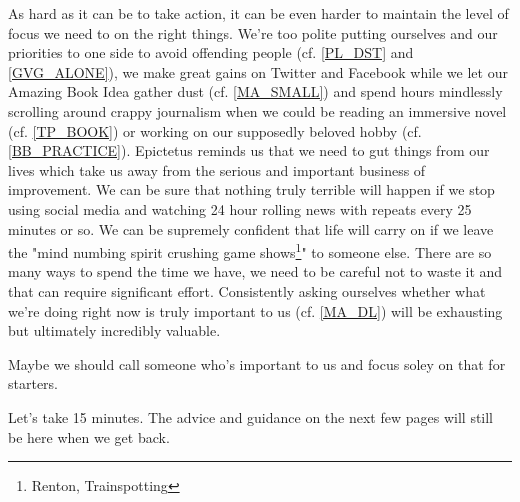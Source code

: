 \cleardoublepage
\begin{multicols}{2}

As hard as it can be to take action, it can be even harder to maintain the level of focus we need to on the right things. We're too polite putting ourselves and our priorities to one side to avoid offending people (cf. \ref{PL_DST} and \ref{GVG_ALONE}), we make great gains on Twitter and Facebook while we let our Amazing Book Idea gather dust (cf. \ref{MA_SMALL}) and spend hours mindlessly scrolling around crappy journalism when we could be reading an immersive novel (cf. \ref{TP_BOOK}) or working on our supposedly beloved hobby (cf. \ref{BB_PRACTICE}). 
Epictetus reminds us that we need to gut things from our lives which take us away from the serious and important business of improvement. We can be sure that nothing truly terrible will happen if we stop using social media and watching 24 hour rolling news with repeats every 25 minutes or so. We can be supremely confident that life will carry on if we leave the "mind numbing spirit crushing game shows\footnote{Renton, Trainspotting}" to someone else. There are so many ways to spend the time we have, we need to be careful not to waste it and that can require significant effort. Consistently asking ourselves whether what we're doing right now is truly important to us (cf. \ref{MA_DL}) will be exhausting but ultimately incredibly valuable.

Maybe we should call someone who's important to us and focus soley on that for starters. 

Let's take 15 minutes. The advice and guidance on the next few pages will still be here when we get back. 

\end{multicols}
\clearpage
